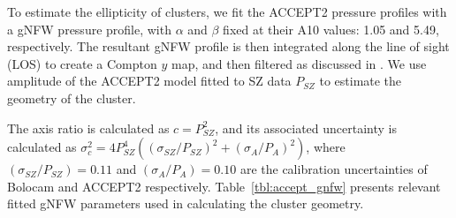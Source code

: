 \documentclass[iop,numberedappendix,apj]{emulateapj}
\begin{document}

To estimate the ellipticity of clusters, we fit the ACCEPT2 pressure profiles with
a gNFW pressure profile, with $\alpha$ and $\beta$ fixed at their A10 values: 1.05 and 5.49,
respectively. 
The resultant gNFW profile
is then integrated along the line of sight (LOS) to create a Compton $y$ map, and then filtered as 
discussed in \citet{romero2015a}. We use amplitude of the ACCEPT2 model fitted to SZ data
$P_{SZ}$ to estimate the geometry of the cluster.

The axis ratio is calculated as $c = P_{SZ}^{2}$, and its associated uncertainty
is calculated as 
$\sigma_{c}^2 = 4 P_{SZ}^{4} ((\sigma_{SZ}/P_{SZ})^2 + (\sigma_{A}/P_{A})^2)$, 
where $(\sigma_{SZ}/P_{SZ}) = 0.11$ and $(\sigma_{A}/P_{A}) = 0.10$ 
are the calibration uncertainties of Bolocam and ACCEPT2 respectively. 
Table~\ref{tbl:accept_gnfw} presents relevant fitted gNFW parameters used in calculating
the cluster geometry.
\end{document}

